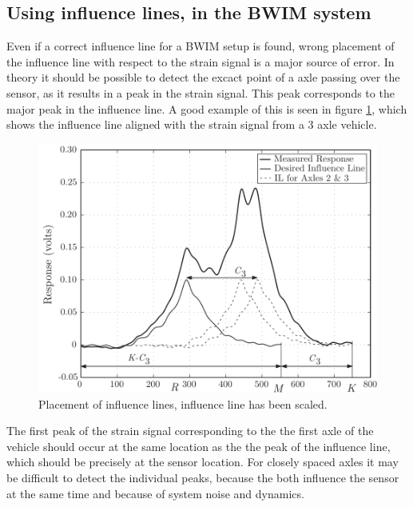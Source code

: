 \subsection{Using influence lines, in the BWIM system}
Even if a correct influence line for a BWIM setup is found, wrong placement of the influence line with respect to the strain signal is a major source of error. In theory it should be possible to detect the excact point of a axle passing over the sensor, as it results in a peak in the strain signal. This peak corresponds to the major peak in the influence line. A good example of this is seen in figure \ref{fig:strain_vs_influenceLine}, which shows the influence line aligned with the strain signal from a 3 axle vehicle.
\begin{figure}[htbp]
	\begin{adjustbox}{center}
		\includegraphics[width=\textwidth]{figures/strain_vs_influenceline}
	\end{adjustbox}
	\caption{Placement of influence lines, influence line has been scaled.}
	\label{fig:strain_vs_influenceLine}
\end{figure}
The first peak of the strain signal corresponding to the the first axle of the vehicle should occur at the same location as the the peak of the influence line, which should be precisely at the sensor location.
For closely spaced axles it may be difficult to detect the individual peaks, because the both influence the sensor at the same time and because of system noise and dynamics.

